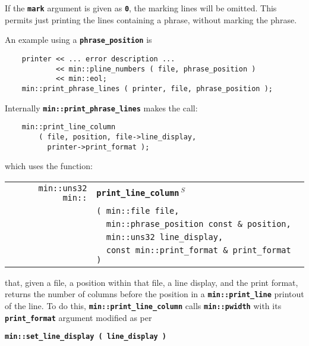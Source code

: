 \documentclass[12pt]{article}
\makeatletter
\newcommand{\TT}[1]{{\tt \bfseries #1}}
\newcommand{\ttindex}[1]{\index{#1@{\tt #1}}}
\newcommand{\EOL}{\penalty \exhyphenpenalty}
\newenvironment{indpar}[1][0.3in]%
	{\begin{list}{}%
		     {\setlength{\itemsep}{0in}%
		      \setlength{\topsep}{0in}%
		      \setlength{\parsep}{1ex}%
		      \setlength{\labelwidth}{#1}%
		      \setlength{\leftmargin}{#1}%
		      \addtolength{\leftmargin}{\labelsep}}%
	 \item}%
	{\end{list}}
\newcommand{\LABEL}[1]{\label{#1}}
\newlength{\ARGBREAKLENGTH}
\newcommand{\ARGBREAK}[1][\ARGBREAKLENGTH]{\\&\hspace*{#1}}
\newcommand{\MINKEY}[1]%
	   {\TT{#1}\ttindex{min::#1}\ttindex{#1}}
\newcommand{\RESIZE}{$\,^S$}
\makeatother
\begin{document}
If the \TT{mark} argument is given as \TT{0}, the marking lines
will be omitted.  This permits just printing the lines containing
a phrase, without marking the phrase.

An example using a \TT{phrase\_position} is

\begin{indpar}\begin{verbatim}
    printer << ... error description ...
            << min::pline_numbers ( file, phrase_position )
            << min::eol;
    min::print_phrase_lines ( printer, file, phrase_position );
\end{verbatim}\end{indpar}

Internally \TT{min::\EOL print\_\EOL phrase\_\EOL lines}
makes the call:

\begin{indpar}\begin{verbatim}
    min::print_line_column
        ( file, position, file->line_display,
          printer->print_format );
\end{verbatim}\end{indpar}

which uses the function:

\begin{indpar}[1em]\begin{tabular}{r@{}l}
\verb|min::uns32 min::|
    & \MINKEY{print\_\EOL line\_\EOL column\RESIZE}\ARGBREAK
      \verb|( min::file file,|\ARGBREAK
      \verb|  min::phrase_position const & position,|\ARGBREAK
      \verb|  min::uns32 line_display,|\ARGBREAK
      \verb|  const min::print_format & print_format )|
\LABEL{MIN::PRINT_LINE_COLUMN} \\
\end{tabular}\end{indpar}

that, given a file, a position within that file, a line display,
and the print format, returns the number of
columns before the position in a \TT{min::\EOL print\_\EOL line}
printout of the line.  To do this, \TT{min::\EOL print\_\EOL line\_\EOL column}
calls \TT{min::\EOL pwidth} with its \TT{print\_\EOL format} argument modified
as per
\begin{center}
\TT{min::set\_line\_display ( line\_display )}
\end{center}
\end{document}
